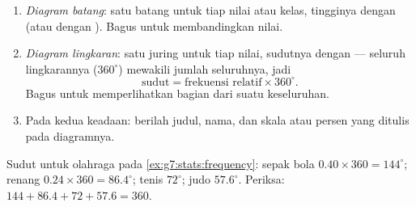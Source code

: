 \begin{method}\label{met:g7:stats:charts}
\begin{enumerate}
  \item \emph{Diagram batang}: satu batang untuk tiap nilai atau
        kelas, tingginya  dengan  (atau dengan
        ). Bagus untuk membandingkan nilai.
  \item \emph{Diagram lingkaran}: satu juring untuk tiap nilai,
        sudutnya  dengan  --- seluruh
        lingkarannya ($360^\circ$) mewakili jumlah seluruhnya, jadi
        \[
        \text{sudut} = \text{frekuensi relatif} \times 360^\circ .
        \]
        Bagus untuk memperlihatkan bagian dari suatu keseluruhan.
  \item Pada kedua keadaan: berilah judul, nama, dan skala atau persen
        yang ditulis pada diagramnya.
\end{enumerate}
\end{method}

\begin{example}\label{ex:g7:stats:pie}
Sudut untuk olahraga pada \cref{ex:g7:stats:frequency}: sepak bola
$0.40 \times 360 = 144^\circ$; renang $0.24 \times 360 =
86.4^\circ$; tenis $72^\circ$; judo $57.6^\circ$. Periksa:
$144 + 86.4 + 72 + 57.6 = 360$.
\end{example}

